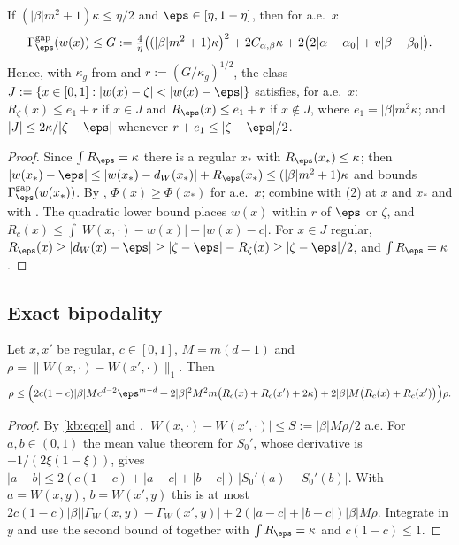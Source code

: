 \begin{proposition}\label{kb:prop:pointwise}
If $(|\beta|m^2+1)\kappa\le\eta/2$ and $\eps\in[\eta,1-\eta]$, then for a.e.\ $x$
\[
  \Gamma^{\mathrm{gap}}_\eps(w(x))\le G:=\tfrac4\eta\bigl((|\beta|m^2+1)\kappa\bigr)^2
  +2C_{\alpha,\beta}\kappa+2\bigl(2|\alpha-\alpha_0|+v|\beta-\beta_0|\bigr).
\]
Hence, with $\kappa_g$ from  and $r:=(G/\kappa_g)^{1/2}$, the class
$J:=\{x\in[0,1]:|w(x)-\zeta|<|w(x)-\eps|\}$ satisfies, for a.e.\ $x$:
$R_\zeta(x)\le e_1+r$ if $x\in J$ and $R_\eps(x)\le e_1+r$ if $x\notin J$, where
$e_1=|\beta|m^2\kappa$; and $|J|\le2\kappa/|\zeta-\eps|$ whenever $r+e_1\le|\zeta-\eps|/2$.
\end{proposition}

\begin{proof}
Since $\int R_\eps=\kappa$ there is a regular $x_*$ with $R_\eps(x_*)\le\kappa$; then
$|w(x_*)-\eps|\le|w(x_*)-d_W(x_*)|+R_\eps(x_*)\le(|\beta|m^2+1)\kappa$ and
 bounds $\Gamma^{\mathrm{gap}}_\eps(w(x_*))$.  By ,
$\Phi(x)\ge\Phi(x_*)$ for a.e.\ $x$; combine with (2) at $x$ and $x_*$ and
with .  The quadratic lower bound places $w(x)$ within $r$ of $\eps$ or
$\zeta$, and $R_c(x)\le\int|W(x,\cdot)-w(x)|+|w(x)-c|$.  For $x\in J$ regular,
$R_\eps(x)\ge|d_W(x)-\eps|\ge|\zeta-\eps|-R_\zeta(x)\ge|\zeta-\eps|/2$, and
$\int R_\eps=\kappa$.
\end{proof}

\subsection{Exact bipodality}
\label{kb:sec:bip}

\begin{lemma}[Contraction]\label{kb:lem:contraction}
Let $x,x'$ be regular, $c\in[0,1]$, $M=m(d-1)$ and $\rho=\|W(x,\cdot)-W(x',\cdot)\|_1$.  Then
\[
  \rho\le\Bigl(2c(1-c)|\beta|M c^{d-2}\eps^{m-d}
    +2|\beta|^2M^2m\bigl(R_c(x)+R_c(x')+2\kappa\bigr)
    +2|\beta|M\bigl(R_c(x)+R_c(x')\bigr)\Bigr)\rho .
\]
\end{lemma}

\begin{proof}
By \eqref{kb:eq:el} and , $|W(x,\cdot)-W(x',\cdot)|\le S:=|\beta|M\rho/2$
a.e.  For $a,b\in(0,1)$ the mean value theorem for $S_0'$, whose derivative is
$-1/(2\xi(1-\xi))$, gives $|a-b|\le2(c(1-c)+|a-c|+|b-c|)\,|S_0'(a)-S_0'(b)|$.  With $a=W(x,y)$,
$b=W(x',y)$ this is at most
$2c(1-c)|\beta||\Gamma_W(x,y)-\Gamma_W(x',y)|+2(|a-c|+|b-c|)|\beta|M\rho$.  Integrate in $y$ and
use the second bound of  together with $\int R_\eps=\kappa$ and
$c(1-c)\le1$.
\end{proof}


